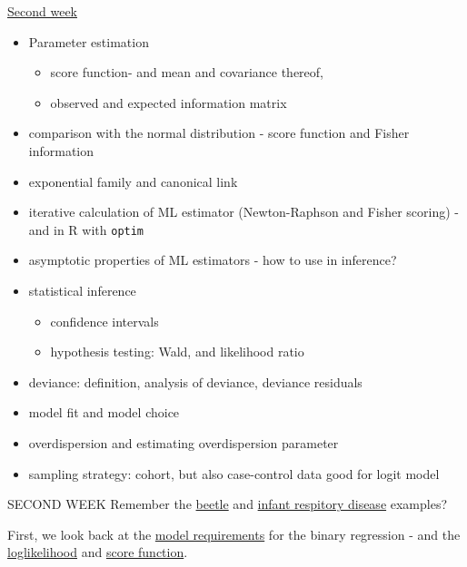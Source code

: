 \documentclass[
  ignorenonframetext,
]{beamer}
\providecommand{\tightlist}{%
  \setlength{\itemsep}{0pt}\setlength{\parskip}{0pt}}
\begin{document}
\begin{frame}[fragile]
\begin{block}{\protect\hyperlink{secondweek}{Second week}}
\protect\hypertarget{second-week}{}
\begin{itemize}
\tightlist
\item
  Parameter estimation

  \begin{itemize}
  \tightlist
  \item
    score function- and mean and covariance thereof,
  \item
    observed and expected information matrix
  \end{itemize}
\item
  comparison with the normal distribution - score function and Fisher
  information
\item
  exponential family and canonical link
\item
  iterative calculation of ML estimator (Newton-Raphson and Fisher
  scoring) - and in R with \texttt{optim}
\item
  asymptotic properties of ML estimators - how to use in inference?
\item
  statistical inference

  \begin{itemize}
  \tightlist
  \item
    confidence intervals
  \item
    hypothesis testing: Wald, and likelihood ratio
  \end{itemize}
\item
  deviance: definition, analysis of deviance, deviance residuals
\item
  model fit and model choice
\item
  overdispersion and estimating overdispersion parameter
\item
  sampling strategy: cohort, but also case-control data good for logit
  model
\end{itemize}
\end{block}
\end{frame}

\begin{frame}
\begin{block}{SECOND WEEK}
\protect\hypertarget{second-week-1}{}
Remember the \protect\hyperlink{beetle1}{beetle} and
\protect\hyperlink{infant1}{infant respitory disease} examples?

First, we look back at the \protect\hyperlink{binaryregassump}{model
requirements} for the binary regression - and the
\protect\hyperlink{loglik}{loglikelihood} and
\protect\hyperlink{score}{score function}.
\end{block}
\end{frame}
\end{document}
